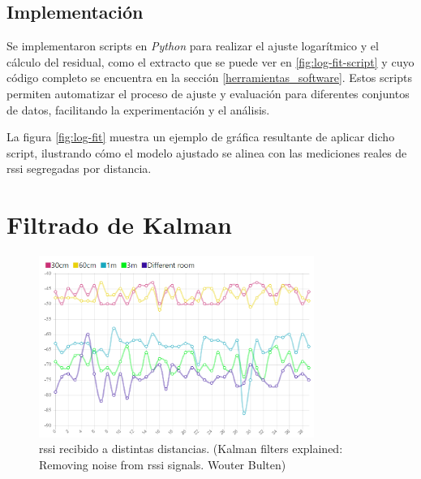 \subsection{Implementación}

Se implementaron scripts en \textit{Python} para realizar el ajuste logarítmico y el cálculo del residual, como el extracto que se puede ver en \ref{fig:log-fit-script} y cuyo código completo se encuentra en la sección \ref{herramientas_software}. Estos scripts permiten automatizar el proceso de ajuste y evaluación para diferentes conjuntos de datos, facilitando la experimentación y el análisis.

La figura \ref{fig:log-fit} muestra un ejemplo de gráfica resultante de aplicar dicho script, ilustrando cómo el modelo ajustado se alinea con las mediciones reales de \acs{rssi} segregadas por distancia.

\section{Filtrado de Kalman}
\begin{figure}[!htb]
	\centering
	\includegraphics[width=0.8\textwidth]{Figuras/fig6.png}
	\captionsetup{margin=2cm}
	\caption[\acs{rssi} recibido a distintas distancias]{\acs{rssi} recibido a distintas distancias. (Kalman filters explained: Removing noise from \acs{rssi} signals. Wouter Bulten)}
	\label{fig:rssi-wouter}
\end{figure}


